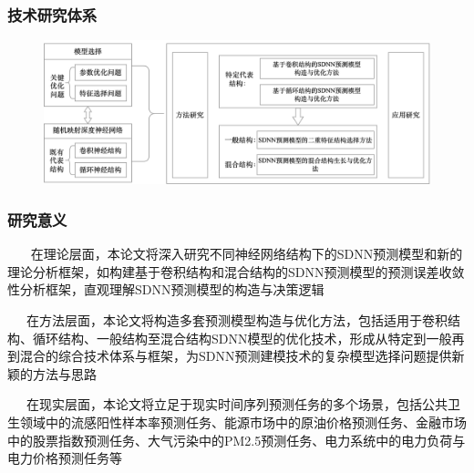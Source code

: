 \begin{frame}
    \frametitle{技术研究体系}
\vspace{-0.5em}
\centering
\begin{figure}[!th]
    \centering
    \includegraphics[width=0.88\linewidth]{float/ch.intro/thesis.png}
    
\end{figure}
\end{frame}

\begin{frame}
    \frametitle{研究意义}

    \textbullet ~~~ 在理论层面，本论文将深入研究不同神经网络结构下的SDNN预测模型和新的理论分析框架，如构建基于卷积结构和混合结构的SDNN预测模型的预测误差收敛性分析框架，直观理解SDNN预测模型的构造与决策逻辑

    \textbullet ~~~在方法层面，本论文将构造多套预测模型构造与优化方法，包括适用于卷积结构、循环结构、一般结构至混合结构SDNN模型的优化技术，形成从特定到一般再到混合的综合技术体系与框架，为SDNN预测建模技术的复杂模型选择问题提供新颖的方法与思路

    \textbullet ~~~在现实层面，本论文将立足于现实时间序列预测任务的多个场景，包括公共卫生领域中的流感阳性样本率预测任务、能源市场中的原油价格预测任务、金融市场中的股票指数预测任务、大气污染中的PM2.5预测任务、电力系统中的电力负荷与电力价格预测任务等
    
\end{frame}